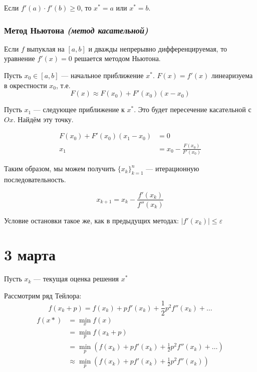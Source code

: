 \begin{remark}
    Если \(f'(a) \cdot f'(b) \geq 0\), то \(x^* = a\) или \(x^* = b\).
\end{remark}

\subsection{Метод Ньютона \textit{(метод касательной)}}

Если \(f\) выпуклая на \([a, b]\) и дважды непрерывно дифференцируемая, то уравнение \(f'(x) = 0\) решается методом Ньютона.

Пусть \(x_0 \in [a, b]\) --- начальное приближение \(x^*\). \(F(x) = f'(x)\) линеаризуема в окрестности \(x_0\), т.е.
\begin{equation}
    F(x) \approx F(x_0) + F'(x_0)(x - x_0)
\end{equation}

Пусть \(x_1\) --- следующее приближение к \(x^*\). Это будет пересечение касательной с \(Ox\). Найдём эту точку.

\begin{align*}
    F(x_0) + F'(x_0) (x_1 - x_0) & = 0                            \\
    x_1                          & = x_0 - \frac{F(x_0)}{F'(x_0)}
\end{align*}

Таким образом, мы можем получить \(\{x_k\}_{k = 1}^{n}\) --- итерационную последовательность.

\[x_{k+1} = x_k - \frac{f'(x_k)}{f''(x_k)} \]

Условие остановки такое же, как в предыдущих методах: \(|f'(x_k)| \leq \varepsilon\)

\chapter{3 марта}

Пусть \(x_k\) --- текущая оценка решения \(x^*\)

Рассмотрим ряд Тейлора:
\[f(x_k + p) = f(x_k) + pf'(x_k) + \frac{1}{2}p^2  f''(x_k) + \dots \]
\begin{align*}
    f(x*) & = \min_x f(x)                                                               \\
          & = \min_p f(x_k + p)                                                         \\
          & = \min_p \left( f(x_k) + pf'(x_k) + \frac{1}{2}p^2 f''(x_k) + \dots \right) \\
          & \approx \min_p \left( f(x_k) + pf'(x_k) + \frac{1}{2}p^2 f''(x_k) \right)   \\
\end{align*}

